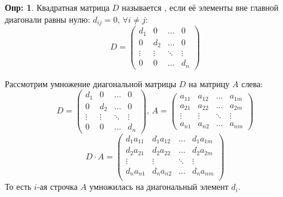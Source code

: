 \documentclass[12pt]{article}
\theoremstyle{definition}
\newtheorem{defn}{Опр:}
\begin{document}
\begin{defn}
	Квадратная матрица $D$ называется , если её элементы вне главной диагонали равны нулю: $d_{ij} = 0, \, \forall i \neq j$:
	$$
		D = 
		\begin{pmatrix}
			d_1  & 0 & \dotsc & 0\\
			0 & d_2 & \dotsc & 0\\
			\vdots & \vdots & \ddots & \vdots \\
			0 & 0 & \dotsc & d_n
		\end{pmatrix}
	$$
\end{defn}
Рассмотрим умножение диагональной матрицы $D$ на матрицу $A$ слева:
$$
	D = \begin{pmatrix}
		d_1  & 0 & \dotsc & 0\\
		0 & d_2 & \dotsc & 0\\
		\vdots & \vdots & \ddots & \vdots \\
		0 & 0 & \dotsc & d_n
	\end{pmatrix}, \, 
	A = 
	\begin{pmatrix}
		a_{11} & a_{12} & \dotsc & a_{1m} \\
		a_{21} & a_{22} & \dotsc & a_{2m}\\
		\vdots & \vdots & \ddots & \vdots \\
		a_{n1} & a_{n2} & \dotsc & a_{nm}
	\end{pmatrix}
$$
$$
	D{\cdot}A = 
	\begin{pmatrix}
		d_1 a_{11} & d_1 a_{12} & \dotsc & d_1 a_{1m}\\
		d_2 a_{21} & d_2 a_{22} & \dotsc & d_2 a_{2m}\\
		\vdots & \vdots & \ddots & \vdots\\
		d_n a_{n1} & d_n a_{n2} & \dotsc & d_n a_{nm}\\
	\end{pmatrix}
$$
То есть $i$-ая строчка $A$ умножилась на диагональный элемент $d_i$. 
\end{document}
